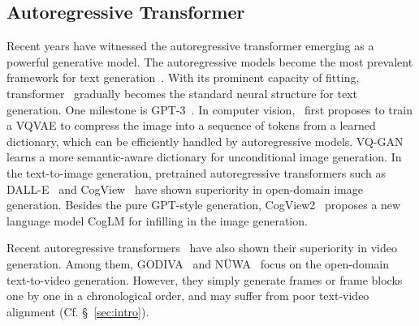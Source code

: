 \subsection{Autoregressive Transformer}
Recent years have witnessed the autoregressive transformer emerging as a powerful generative model. The autoregressive models 
become the most prevalent framework for text generation~\cite{sutskever2011generating}. With its prominent capacity of fitting, transformer~\cite{vaswani2017attention} gradually becomes the standard neural structure for text generation. 
One milestone is GPT-3~\cite{brown2020language}.
In computer vision,~\citet{van2017neural} 
first proposes to train a VQVAE to compress the image into a sequence of tokens from a learned dictionary, which can be efficiently handled by autoregressive models. VQ-GAN~\cite{esser2020taming} learns a more semantic-aware dictionary for unconditional image generation.  
In the text-to-image generation, pretrained autoregressive transformers such as DALL-E~\cite{ramesh2021zero} and CogView~\cite{ding2021cogview} have shown 
superiority in open-domain image generation. Besides the pure GPT-style generation, 
CogView2~\cite{ding2022cogview2} proposes a new language model CogLM for infilling in the image generation.

Recent autoregressive transformers~\cite{rakhimov2020latent, yan2021videogpt, wu2021godiva, wu2021n} have also shown their superiority in video generation. 
Among them, GODIVA~\cite{wu2021godiva} and NÜWA~\cite{wu2021n} focus on the open-domain text-to-video generation.
However, they simply generate frames or frame blocks one by one in a chronological order, and may suffer from poor text-video alignment (Cf. \S~\ref{sec:intro}). 

